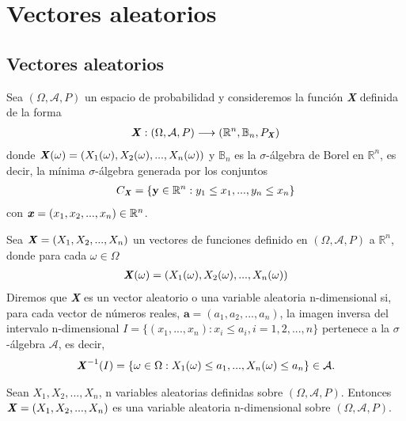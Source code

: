 \chapter{Vectores aleatorios}

\section{Vectores aleatorios}

Sea $(\Omega, \mathcal{A}, P)$ un espacio de probabilidad y consideremos la función \textbf{\textit{X}} definida de la forma
\begin{align*}
    \textbf{\textit{X}} : (\Omega, \mathcal{A}, P) \longrightarrow (\mathbb{R}^n, \mathbb{B}_n, P_{\textbf{\textit{X}}})
\end{align*}
donde $\textbf{\textit{X}}(\omega) = (X_1(\omega), X_2(\omega),..., X_n(\omega))$ y $\mathbb{B}_n$ es la $\sigma$-álgebra de Borel en $\mathbb{R}^n$, es decir, la mínima $\sigma$-álgebra generada por los conjuntos
\begin{align*}
    C_{\textbf{\textit{X}}} = \{ \textbf{y} \in \mathbb{R}^n : y_1 \leq x_1, ..., y_n \leq x_n\}
\end{align*}
con $\textbf{\textit{x}} = (x_1,x_2,...,x_n) \in \mathbb{R}^n$.

\begin{defi}
    Sea $\textbf{\textit{X}} = (X_1, X_2,..., X_n)$ un vectores de funciones definido en $(\Omega, \mathcal{A}, P)$ a $\mathbb{R}^n$, donde para cada $\omega \in \Omega$
    \begin{align*}
        \textbf{\textit{X}}(\omega) = (X_1(\omega), X_2(\omega),..., X_n(\omega))
    \end{align*}
    Diremos que \textbf{\textit{X}} es un vector aleatorio o una variable aleatoria n-dimensional si, para cada vector de números reales, $\textbf{a} = (a_1,a_2,...,a_n)$, la imagen inversa del intervalo n-dimensional $I = \{ (x_1,...,x_n) : x_i \leq a_i, i = 1,2,...,n \}$ pertenece a la $\sigma$-álgebra $\mathcal{A}$, es decir,
    \begin{align*}
        \textbf{\textit{X}}^{-1}(I) = \{ \omega \in \Omega : X_1(\omega) \leq a_1, ..., X_n(\omega) \leq a_n \} \in \mathcal{A}.
    \end{align*}
\end{defi}

\begin{teo}
    Sean $X_1,X_2,...,X_n$, n variables  aleatorias definidas sobre $(\Omega, \mathcal{A}, P)$. Entonces  $\textbf{\textit{X}} = (X_1, X_2,..., X_n)$ es una variable aleatoria n-dimensional sobre $(\Omega, \mathcal{A}, P)$.
\end{teo}


